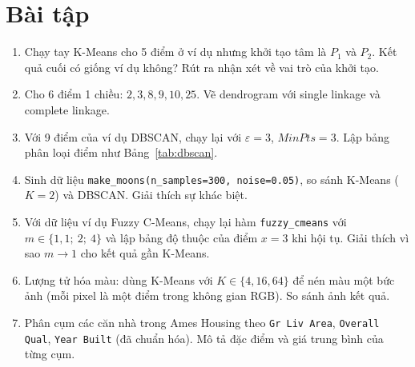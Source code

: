 \section{Bài tập}
\begin{enumerate}
    \item Chạy tay K-Means cho 5 điểm ở ví dụ nhưng khởi tạo tâm là $P_1$ và $P_2$. Kết quả cuối có giống ví dụ không? Rút ra nhận xét về vai trò của khởi tạo.
    \item Cho 6 điểm 1 chiều: $2, 3, 8, 9, 10, 25$. Vẽ dendrogram với single linkage và complete linkage.
    \item Với 9 điểm của ví dụ DBSCAN, chạy lại với $\varepsilon = 3$, $\mathit{MinPts} = 3$. Lập bảng phân loại điểm như Bảng~\ref{tab:dbscan}.
    \item Sinh dữ liệu \texttt{make\_moons(n\_samples=300, noise=0.05)}, so sánh K-Means ($K = 2$) và DBSCAN. Giải thích sự khác biệt.
    \item Với dữ liệu ví dụ Fuzzy C-Means, chạy lại hàm \texttt{fuzzy\_cmeans} với $m \in \{1{,}1;\ 2;\ 4\}$ và lập bảng độ thuộc của điểm $x = 3$ khi hội tụ. Giải thích vì sao $m \to 1$ cho kết quả gần K-Means.
    \item Lượng tử hóa màu: dùng K-Means với $K \in \{4, 16, 64\}$ để nén màu một bức ảnh (mỗi pixel là một điểm trong không gian RGB). So sánh ảnh kết quả.
    \item Phân cụm các căn nhà trong Ames Housing theo \texttt{Gr Liv Area}, \texttt{Overall Qual}, \texttt{Year Built} (đã chuẩn hóa). Mô tả đặc điểm và giá trung bình của từng cụm.
\end{enumerate}

